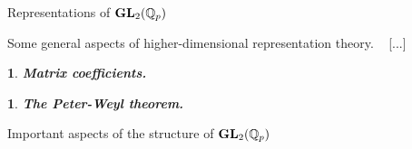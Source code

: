 \documentclass[letterpaper,11pt, reqno]{amsart}
\newtheorem{monodromy theorem}{Monodromy Theorem}[subsection]
\newtheorem{wild conjecture}[theorem]{Wild Conjecture}
\newtheorem{research objectives}{Research objectives}[subsection]
\newtheorem{research question}[theorem]{Research questions}
\newtheorem{aside question}[theorem]{Aside question}
\newtheorem{audio example}[theorem]{\loudspeaker[3] Example}
\newtheorem{blank remark}[theorem]{}
\newtheorem{ssubsection}[theorem]{}
\newtheorem{terminology and comment}[theorem]{Terminology and comment}
\newtheorem{purity hypothesis}[theorem]{Purity hypothesis}
\newtheorem{corollary of the purity hypothesis}[theorem]{Corollary of the purity hypothesis}
\newcommand{\QQ} {{\mathbb Q}}
\numberwithin{equation}{theorem}
\begin{document}
\vskip 1cm

\begin{section}{Representations of $\bold{GL}_{2}(\QQ_p)$}

\begin{subsection}{Some general aspects of higher-dimensional representation theory.}
\ {\color{red} [...]}

\begin{ssubsection}
{\bf Matrix coefficients.}
\normalfont
\end{ssubsection}

\begin{ssubsection}
{\bf The Peter-Weyl theorem.}
\normalfont
\end{ssubsection}

\end{subsection}

\begin{subsection}{Important aspects of the structure of $\bold{GL}_2(\QQ_p)$}


\end{subsection}
\end{section}
\end{document}
